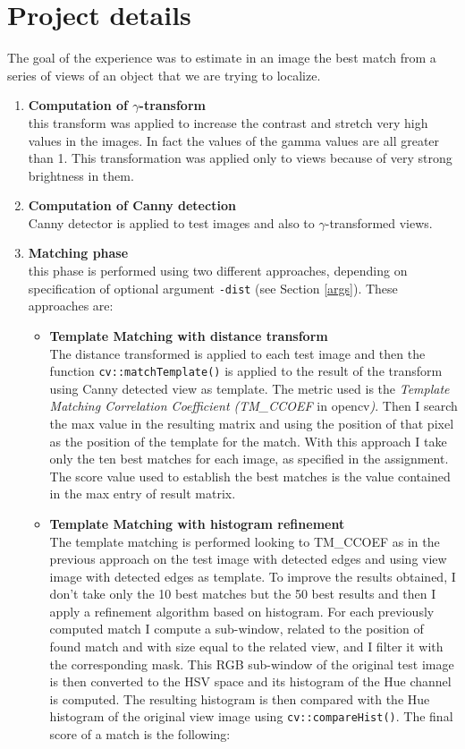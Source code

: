 \documentclass{article}
\begin{document}
\section{Project details}\label{details}
The goal of the experience was to estimate in an image the best match from a series of views of an object that we are trying to localize. 
\begin{enumerate}
\item{\textbf{Computation of $\gamma$-transform}\\
this transform was applied to increase the contrast and stretch very high values in the images. In fact the values of the gamma values are all greater than 1. This transformation was applied only to views because of very strong brightness in them.}
\item{\textbf{Computation of Canny detection}\\
Canny detector is applied to test images and also to $\gamma$-transformed views.}
\item{\textbf{Matching phase}\\
this phase is performed using two different approaches, depending on specification of optional argument \texttt{-dist} (see Section \ref{args}). These approaches are:
\begin{itemize}
\item{\textbf{Template Matching with distance transform}\\
The distance transformed is applied to each test image and then the function \texttt{cv::matchTemplate()} is applied to the result of the transform using Canny detected view as template. The metric used is the \textit{Template Matching Correlation Coefficient (TM\_CCOEF} in opencv\textit{)}. Then I search the max value in the resulting matrix and using the position of that pixel as the position of the template for the match. With this approach I take only the ten best matches for each image, as specified in the assignment. The score value used to establish the best matches is the value contained in the max entry of result matrix.
}
\item{\textbf{Template Matching with histogram refinement}\\
The template matching is performed looking to TM\_CCOEF as in the previous approach on the test image with detected edges and using view image with detected edges as template. To improve the results obtained, I don't take only the 10 best matches but the 50 best results and then I apply a refinement algorithm based on histogram. For each previously computed match I compute a sub-window, related to the position of found match and with size equal to the related view, and I filter it with the corresponding mask. This RGB sub-window of the original test image is then converted to the HSV space and its histogram of the Hue channel is computed. The resulting histogram is then compared with the Hue histogram of the original view image using \texttt{cv::compareHist()}. The final score of a match is the following:
}
\end{itemize}}
\end{enumerate}
\end{document}

